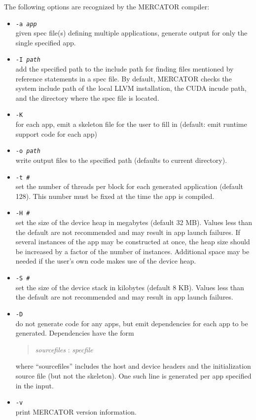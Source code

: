 \documentclass[11pt]{article}
\begin{document}
The following options are recognized by the MERCATOR compiler:
\begin{itemize}

\item \texttt{-a \textit{app}} \\
   given spec file(s) defining multiple applications, generate output
   for only the single specified app.

\item \texttt{-I \textit{path}} \\
   add the specified path to the include path for finding files
   mentioned by reference statements in a spec file.  By default,
   MERCATOR checks the system include path of the local LLVM
   installation, the CUDA incude path, and the directory where the
   spec file is located.

\item \texttt{-K} \\
   for each app, emit a skeleton file for the user to fill in
    (default: emit runtime support code for each app)

\item \texttt{-o \textit{path}} \\
   write output files to the specified path (defaults to current directory).

\item \texttt{-t \textit{\#}} \\
  set the number of threads per block for each generated application
  (default 128).  This number must be fixed at the time the app is
  compiled.
  
\item \texttt{-H \textit{\#}} \\ 
  set the size of the device heap in megabytes (default 32 MB).
  Values less than the default are not recommended and may result in
  app launch failures.  If several instances of the app may be
  constructed at once, the heap size should be increased by a factor
  of the number of instances.  Additional space may be needed if the
  user's own code makes use of the device heap.

\item \texttt{-S \textit{\#}} \\
  set the size of the device stack in kilobytes  (default 8 KB).
  Values less than the default are not recommended and may result
  in app launch failures.

\item \texttt{-D} \\
  do not generate code for any apps, but emit dependencies for
  each app to be generated.  Dependencies have the form
\begin{quote}
  \textit{sourcefiles} : \textit{specfile}
\end{quote}
where ``sourcefiles'' includes the host and device headers and the
initialization source file (but not the skeleton).  One such line is
generated per app specified in the input.

\item \texttt{-v} \\
   print MERCATOR version information.

\end{itemize}
\end{document}
